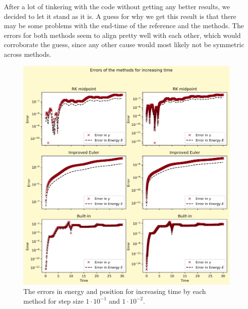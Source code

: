 \documentclass[12pt, a4paper,usenames,dvipsnames]{article}
\begin{document}
After a lot of tinkering with the code without getting any better results, we decided to let it stand as it is. A guess for why we get this result is that there may be some problems with the end-time of the reference and the methods. The errors for both methods seem to align pretty well with each other, which would corroborate the guess, since any other cause would most likely not be symmetric across methods.


\thispagestyle{plain}
\begin{figure}[h!]
    \centering
    \includegraphics[width=\linewidth]{Graphs2d.png}
    \caption{The errors in energy and position for increasing time by each method for step size \(1\cdot10^{-1}\) and \(1\cdot10^{-2}\).}
    \label{fig:gr2d}
\end{figure}
\restoregeometry
\end{document}

